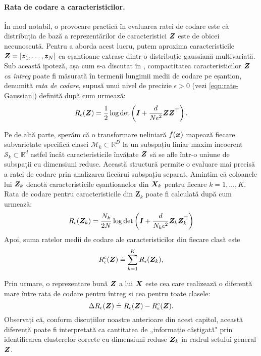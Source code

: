 \documentclass[../../book-main_ro.tex]{subfiles}
\begin{document}
\paragraph{Rata de codare a caracteristicilor.} În mod notabil, o provocare practică în evaluarea ratei de codare este că distribuția de bază a reprezentărilor de caracteristici $\bm{Z}$ este de obicei necunoscută. Pentru a aborda acest lucru, putem aproxima caracteristicile $\bm{Z} = [\bm{z}_1, \ldots, \bm{z}_N]$ ca eșantioane extrase dintr-o distribuție gaussiană multivariată. Sub această ipoteză, așa cum s-a discutat în , compactitatea caracteristicilor $\bm{Z}$ {\em ca întreg} poate fi măsurată în termenii lungimii medii de codare pe eșantion, denumită {\em rata de codare}, supusă unui nivel de precizie $\epsilon > 0$ (vezi \eqref{eqn:rate-Gaussian}) definită după cum urmează:
\begin{equation}
	R_{\epsilon}(\bm{Z}) = \frac{1}{2}\log\det\left(\bm{I} + \frac{d}{N\epsilon^{2}}\bm{Z}\bm{Z}^{\top}\right).
	\label{chap4-eqn:coding-length-eval}
\end{equation}

Pe de altă parte, sperăm că o transformare neliniară $f(\bm{x})$ mapează fiecare subvarietate specifică clasei $\mathcal{M}_k \subset \mathbb{R}^D$ la un subspațiu liniar maxim incoerent $\mathcal{S}_k \subset \mathbb{R}^d$ astfel încât caracteristicile învățate $\bm{Z}$ să se afle într-o uniune de subspații cu dimensiuni reduse. Această structură permite o evaluare mai precisă a ratei de codare prin analizarea fiecărui subspațiu separat.
Amintim că coloanele lui $\bm{Z}_k$ denotă caracteristicile eșantioanelor din $\bm{X}_k$ pentru fiecare $k=1,\dots,K$. Rata de codare pentru caracteristicile din $\bm Z_k$ poate fi calculată după cum urmează:
\begin{align}
    R_{\epsilon}(\bm{Z}_k) = \frac{N_k}{2N}\log\det\left(\bm{I} + \frac{d}{N_k\epsilon^{2}}\bm{Z}_k\bm{Z}_k^{\top}\right)
\end{align}
Apoi, suma ratelor medii de codare ale caracteristicilor din fiecare clasă este
\begin{equation}
	 R_{\epsilon}^c(\bm{Z}) \doteq \sum_{k=1}^K R_{\epsilon}(\bm{Z}_k),
	\label{chap4-eqn:compress-loss-eval}
\end{equation}

Prin urmare, o reprezentare bună $\bm{Z}$ a lui $\bm{X}$ este cea care realizează o diferență mare între rata de codare pentru întreg și cea pentru toate clasele:
\begin{equation}
	\Delta R_{\epsilon}(\bm{Z}) \doteq R_{\epsilon}(\bm{Z}) - R_{\epsilon}^c(\bm{Z}).
	\label{chap4-eqn:coding-length-reduction}
\end{equation}
Observați că, conform discuțiilor noastre anterioare din acest capitol, această diferență poate fi interpretată ca cantitatea de „informație câștigată" prin identificarea clusterelor corecte cu dimensiuni reduse $\bm{Z}_k$ în cadrul setului general $\bm{Z}$.
\end{document}
